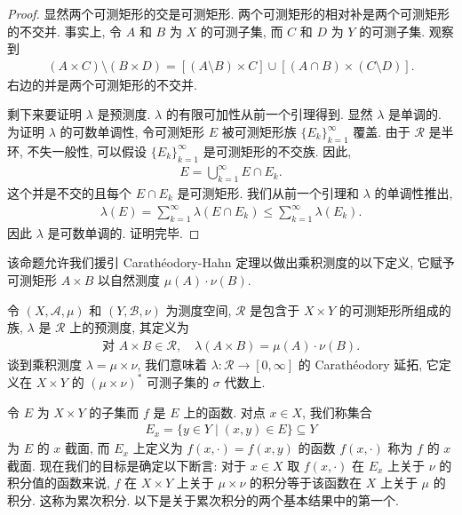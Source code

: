 \documentclass[../../main.tex]{subfiles}
\begin{document}
\begin{proof}
显然两个可测矩形的交是可测矩形. 两个可测矩形的相对补是两个可测矩形的不交并. 事实上, 令 $A$ 和 $B$ 为 $X$ 的可测子集, 而 $C$ 和 $D$ 为 $Y$ 的可测子集. 观察到
\begin{align*}
(A\times C)\setminus(B\times D)=[(A\setminus B)\times C]\cup[(A\cap B)\times(C\setminus D)].
\end{align*}
右边的并是两个可测矩形的不交并.

剩下来要证明 $\lambda$ 是预测度. $\lambda$ 的有限可加性从前一个引理得到. 显然 $\lambda$ 是单调的. 为证明 $\lambda$ 的可数单调性, 令可测矩形 $E$ 被可测矩形族 $\{E_{k}\}_{k=1}^{\infty}$ 覆盖. 由于 $\mathcal{R}$ 是半环, 不失一般性, 可以假设 $\{E_{k}\}_{k=1}^{\infty}$ 是可测矩形的不交族. 因此,
\begin{align*}
E=\bigcup_{k=1}^{\infty}E\cap E_{k}.
\end{align*}
这个并是不交的且每个 $E\cap E_{k}$ 是可测矩形. 我们从前一个引理和 $\lambda$ 的单调性推出,
\begin{align*}
\lambda(E)=\sum_{k=1}^{\infty}\lambda(E\cap E_{k})\leqslant\sum_{k=1}^{\infty}\lambda(E_{k}).
\end{align*}
因此 $\lambda$ 是可数单调的. 证明完毕.
\end{proof}

该命题允许我们援引 Carath\'eodory-Hahn 定理以做出乘积测度的以下定义, 它赋予可测矩形 $A\times B$ 以自然测度 $\mu(A)\cdot\nu(B)$.

\begin{definition}[乘积测度]\label{definition:ch20-乘积测度}
令 $(X,\mathcal{A},\mu)$ 和 $(Y,\mathcal{B},\nu)$ 为测度空间, $\mathcal{R}$ 是包含于 $X\times Y$ 的可测矩形所组成的族, $\lambda$ 是 $\mathcal{R}$ 上的预测度, 其定义为
\begin{align*}
\text{对 }A\times B\in\mathcal{R},\quad\lambda(A\times B)=\mu(A)\cdot\nu(B).
\end{align*}
谈到乘积测度 $\lambda=\mu\times\nu$, 我们意味着 $\lambda:\mathcal{R}\to[0,\infty]$ 的 Carath\'eodory 延拓, 它定义在 $X\times Y$ 的 $(\mu\times\nu)^{*}$ 可测子集的 $\sigma$ 代数上.
\end{definition}

令 $E$ 为 $X\times Y$ 的子集而 $f$ 是 $E$ 上的函数. 对点 $x\in X$, 我们称集合
\begin{align*}
E_{x}=\{y\in Y\mid(x,y)\in E\}\subseteq Y
\end{align*}
为 $E$ 的 $x$ 截面, 而 $E_{x}$ 上定义为 $f(x,\cdot)=f(x,y)$ 的函数 $f(x,\cdot)$ 称为 $f$ 的 $x$ 截面. 现在我们的目标是确定以下断言: 对于 $x\in X$ 取 $f(x,\cdot)$ 在 $E_{x}$ 上关于 $\nu$ 的积分值的函数来说, $f$ 在 $X\times Y$ 上关于 $\mu\times\nu$ 的积分等于该函数在 $X$ 上关于 $\mu$ 的积分. 这称为累次积分. 以下是关于累次积分的两个基本结果中的第一个.
\end{document}
